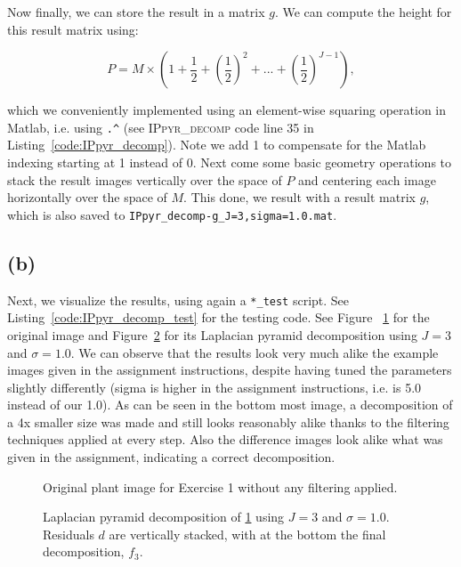 \documentclass{article}
\begin{document}
Now finally, we can store the result in a matrix $g$. We can compute the height for this result matrix using:


\[
    P = M \times (1+\frac{1}{2}+(\frac{1}{2})^2+...+(\frac{1}{2})^{J-1}),
\]

which we conveniently implemented using an element-wise squaring operation in Matlab, i.e. using \texttt{.\^} (see \textsc{IPpyr\_decomp} code line 35 in Listing~\ref{code:IPpyr_decomp}). Note we add 1 to compensate for the Matlab indexing starting at 1 instead of 0. Next come some basic geometry operations to stack the result images vertically over the space of $P$ and centering each image horizontally over the space of $M$. This done, we result with a result matrix $g$, which  is also saved to \texttt{IPpyr\_decomp-g\_J=3,sigma=1.0.mat}.

\subsection*{(b)} Next, we visualize the results, using again a \texttt{*\_test} script. See Listing~\ref{code:IPpyr_decomp_test} for the testing code. See Figure ~\ref{fig:plant_original} for the original image and Figure~\ref{fig:plant_all_pyr-decomp} for its Laplacian pyramid decomposition using $J=3$ and $\sigma=1.0$. We can observe that the results look very much alike the example images given in the assignment instructions, despite having tuned the parameters slightly differently (sigma is higher in the assignment instructions, i.e. is 5.0 instead of our 1.0). As can be seen in the bottom most image, a decomposition of a 4x smaller size was made and still looks reasonably alike thanks to the filtering techniques applied at every step. Also the difference images look alike what was given in the assignment, indicating a correct decomposition.

\begin{figure}[H]
    \centering
    
    \caption{Original plant image for Exercise 1 without any filtering applied.}
    \label{fig:plant_original}
\end{figure}

\newpage
\begin{figure}[H]
    \centering
    
    \caption{Laplacian pyramid decomposition of \ref{fig:plant_original} using $J=3$ and $\sigma=1.0$. Residuals $d$ are vertically stacked, with at the bottom the final decomposition, $f_{3}$.}
    \label{fig:plant_all_pyr-decomp}
\end{figure}
\end{document}
